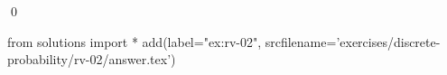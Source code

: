 
\begin{ex} 
  \label{ex:rv-02}
  
  \qed
\end{ex} 
\begin{python0}
from solutions import *
add(label="ex:rv-02",
    srcfilename='exercises/discrete-probability/rv-02/answer.tex') 
\end{python0}
